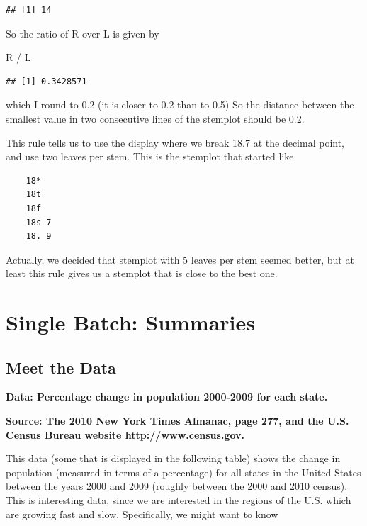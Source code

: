 \documentclass[
]{book}
\newenvironment{Shaded}{\begin{snugshade}}{\end{snugshade}}
\newcommand{\NormalTok}[1]{#1}
\newcommand{\SpecialCharTok}[1]{\textcolor[rgb]{0.00,0.00,0.00}{#1}}
\begin{document}
\begin{verbatim}
## [1] 14
\end{verbatim}

So the ratio of R over L is given by

\begin{Shaded}
\begin{Highlighting}[]
\NormalTok{R }\SpecialCharTok{/}\NormalTok{ L}
\end{Highlighting}
\end{Shaded}

\begin{verbatim}
## [1] 0.3428571
\end{verbatim}

which I round to 0.2 (it is closer to 0.2 than to 0.5) So the distance between the smallest value in two consecutive lines of the stemplot should be 0.2.

This rule tells us to use the display where we break 18.7 at the decimal point, and use two leaves per stem. This is the stemplot that started like

\begin{verbatim}
    18*
    18t
    18f
    18s 7
    18. 9
\end{verbatim}

Actually, we decided that stemplot with 5 leaves per stem seemed better, but at least this rule gives us a stemplot that is close to the best one.

\hypertarget{single-batch-summaries}{%
\chapter{Single Batch: Summaries}\label{single-batch-summaries}}

\hypertarget{meet-the-data-1}{%
\section{Meet the Data}\label{meet-the-data-1}}

\textbf{Data: Percentage change in population 2000-2009 for each state.}

\textbf{Source: The 2010 New York Times Almanac, page 277, and the U.S. Census Bureau website \url{http://www.census.gov}. }

This data (some that is displayed in the following table) shows the change in population (measured in terms of a percentage) for all states in the United States between the years 2000 and 2009 (roughly between the 2000 and 2010 census). This is interesting data, since we are interested in the regions of the U.S. which are growing fast and slow. Specifically, we might want to know
\end{document}

